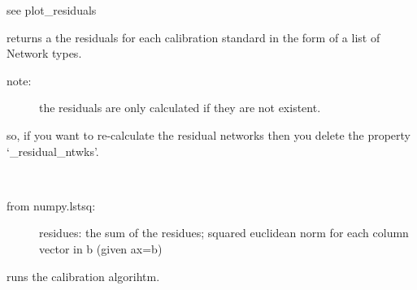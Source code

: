 \documentclass[letterpaper,10pt,english]{sphinxmanual}
\begin{document}
\begin{fulllineitems}
\begin{fulllineitems}
\end{fulllineitems}


\begin{fulllineitems}
\label{api/mwavepy.calibration:mwavepy.calibration.calibration.Calibration.plot_residuals_smith}
see plot\_residuals

\end{fulllineitems}


\begin{fulllineitems}
\label{api/mwavepy.calibration:mwavepy.calibration.calibration.Calibration.residual_ntwks}
returns a the residuals for each calibration standard in the 
form of a list of Network types.
\begin{description}
\item[{note:}] \leavevmode
the residuals are only calculated if they are not existent.

\end{description}

so, if you want to re-calculate the residual networks then 
you delete the property `\_residual\_ntwks'.

\end{fulllineitems}


\begin{fulllineitems}
\label{api/mwavepy.calibration:mwavepy.calibration.calibration.Calibration.residuals}~\begin{description}
\item[{from numpy.lstsq:}] \leavevmode
residues:
the sum of the residues; squared euclidean norm for 
each column vector in b (given ax=b)

\end{description}

\end{fulllineitems}


\begin{fulllineitems}
\label{api/mwavepy.calibration:mwavepy.calibration.calibration.Calibration.run}
runs the calibration algorihtm.
\begin{quote}


\end{quote}
\end{fulllineitems}
\end{fulllineitems}
\end{document}
